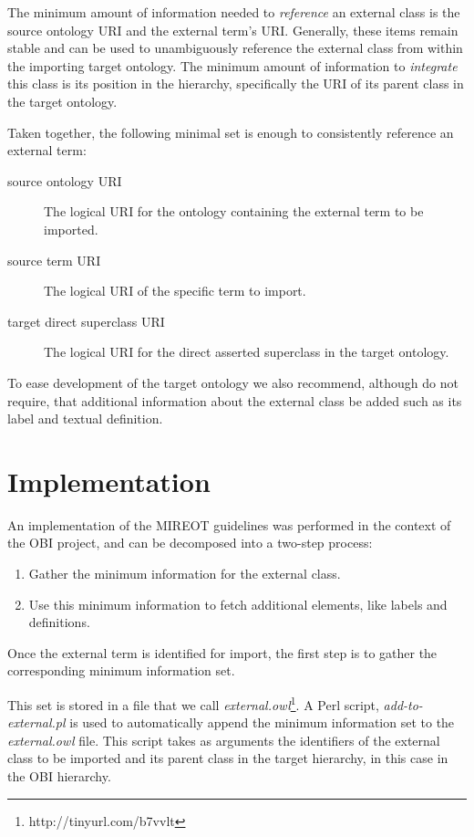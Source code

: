 \documentclass[a4paper,10pt,twocolumn]{article}
\begin{document}
The minimum amount of information needed to \textit{reference} an external class is the source ontology URI and the external term's URI. 
Generally, these items remain stable and can be used to unambiguously reference the external class from within the importing target ontology.
The minimum amount of information to \textit{integrate} this class is its position in the hierarchy, specifically the URI of its parent class in the target ontology. 

Taken together, the following minimal set is enough to consistently reference an external term:
\begin{description}
 \item[source ontology URI] The logical URI for the ontology containing the external term to be imported. 
 \item[source term URI] The logical URI of the specific term to import. 
 \item[target direct superclass URI] The logical URI for the direct asserted superclass in the target ontology.
 \end{description} 


To ease development of the target ontology we also recommend, although do not require, that additional information about the external class be added such as its label and textual definition.

\section*{Implementation}

An implementation of the \ac{MIREOT} guidelines was performed in the context of the \ac{OBI} project, and can be decomposed into a two-step process:

\begin{enumerate}
\item Gather the minimum information for the external class.
\item Use this minimum information to fetch additional elements, like labels and definitions.
\end{enumerate}

Once the external term is identified for import, the first step is to gather the corresponding minimum information set.

This set is stored in a file that we call \emph{external.owl}\footnote{http://tinyurl.com/b7vvlt}.
A Perl script, \emph{add-to-external.pl}\cite{obiscripts} is used to automatically append the minimum information set to the \emph{external.owl} file. 
This script takes as arguments the identifiers of the external class to be imported and its parent class in the target hierarchy, in this case in the \ac{OBI} hierarchy. 
\end{document}
